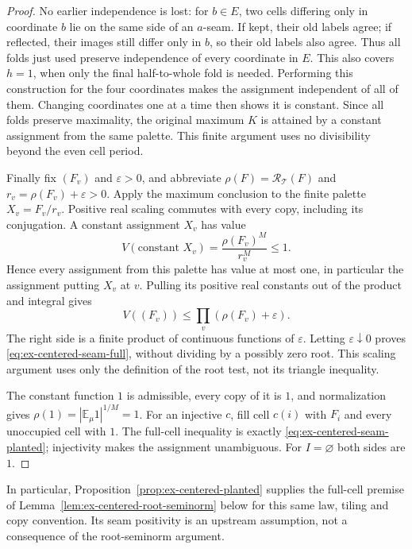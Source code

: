 \begin{proof}
No earlier independence is lost: for $b\in E$, two cells differing
only in coordinate $b$ lie on the same side of an $a$-seam. If kept,
their old labels agree; if reflected, their images still differ only
in $b$, so their old labels also agree. Thus all folds just used
preserve independence of every coordinate in $E$. This also covers
$h=1$, when only the final half-to-whole fold is needed. Performing
this construction for the four coordinates makes the assignment
independent of all of them. Changing coordinates one at a time then
shows it is constant. Since all folds preserve maximality, the original
maximum $K$ is attained by a constant assignment from the same palette.
This finite argument uses no divisibility beyond the even cell period.

Finally fix $(F_v)$ and $\varepsilon>0$, and abbreviate
$\rho(F)=\mathcal R_{\mathcal T}(F)$ and
$r_v=\rho(F_v)+\varepsilon>0$. Apply the maximum conclusion to the
finite palette $X_v=F_v/r_v$. Positive real scaling commutes with
every copy, including its conjugation. A constant assignment $X_v$
has value
\[
 V(\text{constant }X_v)
       =\frac{\rho(F_v)^M}{r_v^M}\le1.
\]
Hence every assignment from this palette has value at most one,
in particular the assignment putting $X_v$ at $v$. Pulling its
positive real constants out of the product and integral gives
\[
 V((F_v))\le\prod_v(\rho(F_v)+\varepsilon).
\]
The right side is a finite product of continuous functions of
$\varepsilon$. Letting $\varepsilon\downarrow0$ proves
\eqref{eq:ex-centered-seam-full}, without dividing by a possibly zero
root. This scaling argument uses only the definition of the root test,
not its triangle inequality.

The constant function $1$ is admissible, every copy of it is $1$,
and normalization gives $\rho(1)=|\mathbb E_\mu1|^{1/M}=1$.
For an injective $c$, fill cell $c(i)$ with $F_i$ and every unoccupied
cell with $1$. The full-cell inequality is exactly
\eqref{eq:ex-centered-seam-planted}; injectivity makes the assignment
unambiguous. For $I=\varnothing$ both sides are $1$.
\end{proof}

In particular, Proposition~\ref{prop:ex-centered-planted} supplies the
full-cell premise of Lemma~\ref{lem:ex-centered-root-seminorm} below
for this same law, tiling and copy convention. Its seam positivity is
an upstream assumption, not a consequence of the root-seminorm argument.

